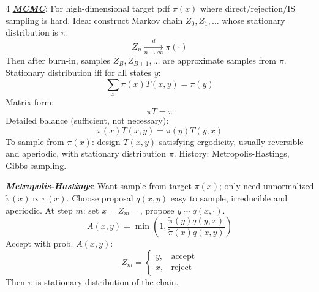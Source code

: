 \documentclass[12pt]{article}
\newcommand{\bulletPoint}[1]{\ul{\textit{\textbf{#1}}}}
\begin{document}
\begin{multicols*}{4}
\bulletPoint{MCMC}:
For high-dimensional target pdf $\pi(x)$ where direct/rejection/IS sampling is hard.
Idea: construct Markov chain $Z_0,Z_1,\ldots$ whose stationary distribution is $\pi$.
\useshortskip \begin{equation*}
    Z_n \xrightarrow[n\to\infty]{d} \pi(\cdot)
\end{equation*}
Then after burn-in, samples $Z_B,Z_{B+1},\ldots$ are approximate samples from $\pi$.
Stationary distribution iff for all states $y$:
\useshortskip \begin{equation*}
    \sum_x \pi(x)T(x,y)=\pi(y)
\end{equation*}
Matrix form:
\useshortskip \begin{equation*}
    \pi T=\pi
\end{equation*}
Detailed balance (sufficient, not necessary):
\useshortskip \begin{equation*}
    \pi(x)T(x,y)=\pi(y)T(y,x)
\end{equation*}
To sample from $\pi(x)$: design $T(x,y)$ satisfying ergodicity, usually reversible and aperiodic, with stationary distribution $\pi$.
History: Metropolis-Hastings, Gibbs sampling.

\bulletPoint{Metropolis-Hastings}:
Want sample from target $\pi(x)$; only need unnormalized $\tilde{\pi}(x)\propto\pi(x)$.
Choose proposal $q(x,y)$ easy to sample, irreducible and aperiodic.
At step $m$: set $x=Z_{m-1}$, propose $y\sim q(x,\cdot)$.
\useshortskip \begin{equation*}
    A(x,y)=\min\!\left(1,\frac{\tilde{\pi}(y)q(y,x)}
    {\tilde{\pi}(x)q(x,y)}\right)
\end{equation*}
Accept with prob. $A(x,y)$:
\useshortskip \begin{equation*}
    Z_m=
    \begin{cases}
        y, & \text{accept}\\
        x, & \text{reject}
    \end{cases}
\end{equation*}
Then $\pi$ is stationary distribution of the chain.

\end{multicols*}
\end{document}
